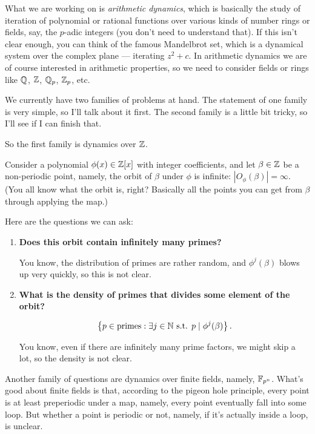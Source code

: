 


\renewcommand{\b}{\beta}



What we are working on is \emph{arithmetic dynamics}, which is
basically the study of iteration of polynomial or rational functions
over various kinds of number rings or fields, say, the $p$-adic
integers (you don't need to understand that). If this isn't clear
enough, you can think of the famous Mandelbrot set, which is a
dynamical system over the complex plane --- iterating $z^2 + c$. In
arithmetic dynamics we are of course interested in arithmetic
properties, so we need to consider fields or rings like $\mathbb{Q}$, $\mathbb{Z}$,
$\mathbb{Q}_p$, $\mathbb{Z}_p$, etc.

We currently have two families of problems at hand. The statement of
one family is very simple, so I'll talk about it first. The second
family is a little bit tricky, so I'll see if I can finish that.

So the first family is dynamics over $\mathbb{Z}$.

Consider a polynomial $\phi(x) \in \mathbb{Z}[x]$ with integer
coefficients, and let $\b \in \Z$ be a non-periodic point, namely,
the orbit of $\b$ under $\phi$ is infinite: $|O_\phi(\b)| =
\infty$. (You all know what the orbit is, right? Basically all the
points you can get from $\b$ through applying the map.)

Here are the questions we can ask:

\begin{enumerate}
\item \textbf{Does this orbit contain infinitely many primes?}

  You know, the distribution of primes are rather random, and
  $\phi^j(\b)$ blows up very quickly, so this is not clear.

\item \textbf{What is the density of primes that divides some element of the
  orbit?}

  \[
  \set{p \in \mathrm{primes} : \exists j \in \N \text{ s.t. } p \mid
    \phi^j(\b)}.
  \]

  You know, even if there are infinitely many prime factors, we might
  skip a lot, so the density is not clear.
\end{enumerate}

Another family of questions are dynamics over finite fields, namely,
$\mathbb{F}_{p^n}$. What's good about finite fields is that, according to the
pigeon hole principle, every point is at least preperiodic under a
map, namely, every point eventually fall into some loop. But whether
a point is periodic or not, namely, if it's actually inside a loop, is
unclear.


